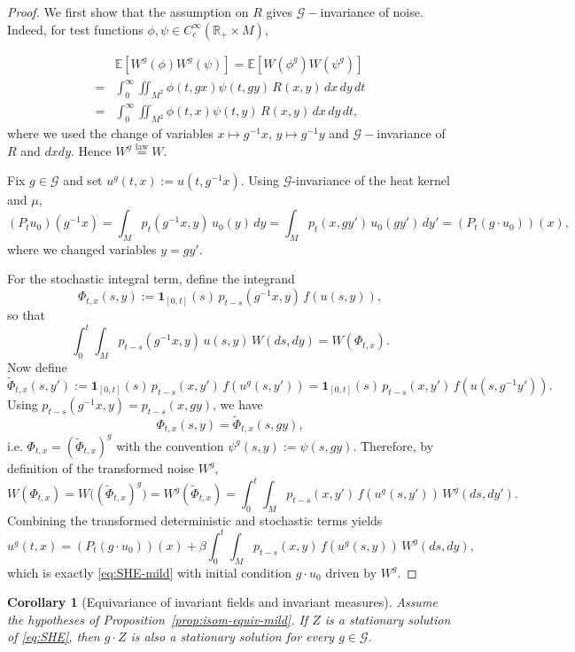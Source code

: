 \documentclass{article}
\newtheorem{corollary}[theorem]{Corollary}
\numberwithin{theorem}{section}
\def\RR{\mathbb{R}} %
\def\EE{\mathbb{E}} %
\def\mc{\mathcal}
\begin{document}
\begin{proof}
We first show that the assumption on $R$ gives $\mc{G}-$invariance of noise. Indeed, for test functions $\phi,\psi\in C_c^\infty(\RR_+\times M)$,

\begin{align*}
    &\EE[W^g(\phi)W^g(\psi)]=\EE[W(\phi^g)W(\psi^g)]\\
    =&\int_0^\infty\iint_{M^2} \phi(t,gx)\psi(t,gy)\,R(x,y)\,dx\,dy\,dt\\
    =&\int_0^\infty\iint_{M^2}  \phi(t,x)\psi(t,y)\,R(x,y)\,dx\,dy\,dt,
\end{align*}
where we used the change of variables $x\mapsto g^{-1}x$, $y\mapsto g^{-1}y$ and $\mc{G}-$invariance of $R$ and $dxdy$. Hence $W^g\stackrel{\mathrm{law}}{=}W$.

Fix $g\in \mathcal{G}$ and set $u^g(t,x):=u(t,g^{-1}x)$.
Using \(\mc{G}\)-invariance of the heat kernel and $\mu$,
\[
(P_t u_0)(g^{-1}x) = \int_{M} p_t(g^{-1}x,y)\,u_0(y)\,dy
= \int_{M} p_t(x,gy')\,u_0(gy')\,dy' 
= (P_t(g\cdot u_0))(x),
\]
where we changed variables $y=gy'$.

For the stochastic integral term, define the integrand
\[
\Phi_{t,x}(s,y):=\mathbf 1_{[0,t]}(s)\,p_{t-s}(g^{-1}x,y)\,f(u(s,y)),
\]
so that
\[
\int_0^t\int_{M} p_{t-s}(g^{-1}x,y)\,u(s,y)\,W(ds,dy)= W(\Phi_{t,x}).
\]
Now define
\[
\widetilde \Phi_{t,x}(s,y'):=\mathbf 1_{[0,t]}(s)\,p_{t-s}(x,y')\,f(u^g(s,y'))
=\mathbf 1_{[0,t]}(s)\,p_{t-s}(x,y')\,f(u(s,g^{-1}y')).
\]
Using $p_{t-s}(g^{-1}x,y)=p_{t-s}(x,gy)$, we have
\[
\Phi_{t,x}(s,y)=\widetilde \Phi_{t,x}(s,gy),
\]
i.e. $\Phi_{t,x} = (\widetilde \Phi_{t,x})^g$ with the convention
$\psi^g(s,y):=\psi(s,gy)$.
Therefore, by definition of the transformed noise $W^g$,
\[
W(\Phi_{t,x}) = W\big((\widetilde \Phi_{t,x})^g\big) = W^g(\widetilde \Phi_{t,x})
= \int_0^t\int_{M} p_{t-s}(x,y')\,f(u^g(s,y'))\,W^g(ds,dy').
\]
Combining the transformed deterministic and stochastic terms yields
\[
u^g(t,x)
=(P_t(g\cdot u_0))(x)
+\beta\int_0^t\int_{M} p_{t-s}(x,y)\,f(u^g(s,y))\,W^g(ds,dy),
\]
which is exactly \eqref{eq:SHE-mild} with initial condition $g\cdot u_0$ driven by $W^g$.\end{proof} 

\begin{corollary}[Equivariance of invariant fields and invariant measures]
\label{cor:isom-equiv-invariant}
Assume the hypotheses of Proposition~\ref{prop:isom-equiv-mild}. If $Z$ is a stationary solution of \eqref{eq:SHE}, then $g\cdot Z$ is also a stationary solution for every $g\in \mc{G}$.
\end{corollary}
\end{document}
